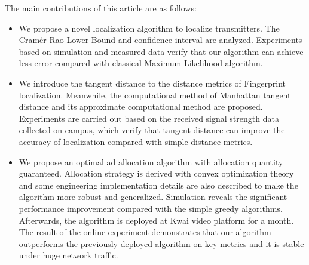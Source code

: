 \begin{eabstract}
   The main contributions of this article are as follows:
   \begin{itemize}
   	\item We propose a novel localization algorithm to localize transmitters. The Cram\'{e}r-Rao Lower Bound and confidence interval are analyzed. Experiments based on simulation and measured data verify that our algorithm can achieve less error compared with classical Maximum Likelihood algorithm.
   	\item We introduce the tangent distance to the distance metrics of Fingerprint localization. Meanwhile, the computational method of Manhattan tangent distance and its approximate computational method are proposed. Experiments are carried out based on the received signal strength data collected on campus, which verify that tangent distance can improve the accuracy of localization compared with simple distance metrics.
   	\item We propose an optimal ad allocation algorithm with allocation quantity guaranteed. Allocation strategy is derived with convex optimization theory and some engineering implementation details are also described to make the algorithm more robust and generalized. Simulation reveals the significant performance improvement compared with the simple greedy algorithms. Afterwards, the algorithm is deployed at Kwai video platform for a month. The result of the online experiment demonstrates that our algorithm outperforms the previously deployed algorithm on key metrics and it is stable under huge network traffic. 
   \end{itemize}
   
\end{eabstract}

